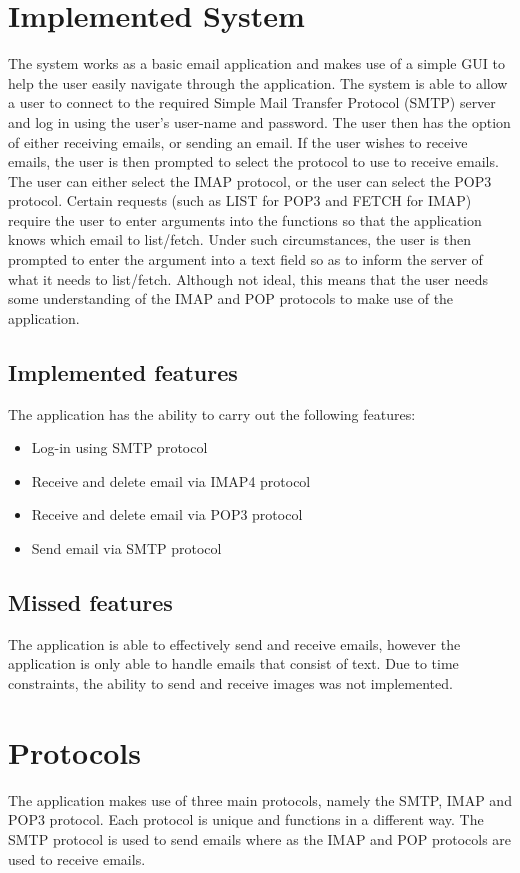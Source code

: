 \documentclass[11pt]{article}
\begin{document}
\begin{multicols}{2}
\section{Implemented System}
The system works as a basic email application and makes use of a simple GUI to help the user easily navigate through the application. The system is able to allow a user to connect to the required Simple Mail Transfer Protocol (SMTP) server and log in using the user's user-name and password. The user then has the option of either receiving emails, or sending an email. If the user wishes to receive emails, the user is then prompted to select the protocol to use to receive emails. The user can either select the IMAP protocol, or the user can select the POP3 protocol. Certain requests (such as LIST for POP3 and FETCH for IMAP) require the user to enter arguments into the functions so that the application knows which email to list/fetch. Under such circumstances, the user is then prompted to enter the argument into a text field so as to inform the server of what it needs to list/fetch. Although not ideal, this means that the user needs some understanding of the IMAP and POP protocols to make use of the application.
\subsection{Implemented features}
The application has the ability to carry out the following features:
\begin{itemize}
  \item Log-in using SMTP protocol
  \item Receive and delete email via IMAP4 protocol
  \item Receive and delete email via POP3 protocol
  \item Send email via SMTP protocol
\end{itemize}
\subsection{Missed features}
The application is able to effectively send and receive emails, however the application is only able to handle emails that consist of text. Due to time constraints, the ability to send and receive images was not implemented.
\section{Protocols}
The application makes use of three main protocols, namely the SMTP, IMAP and POP3 protocol. Each protocol is unique and functions in a different way. The SMTP protocol is used to send emails where as the IMAP and POP protocols are used to receive emails.

\end{multicols}
\end{document}
